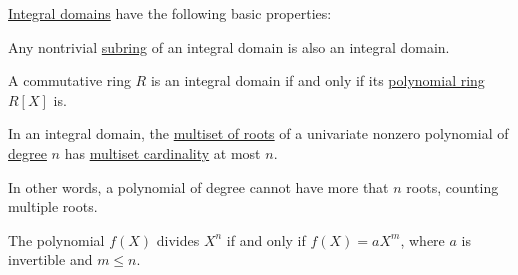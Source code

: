 \begin{proposition}\label{thm:def:integral_domain}
  \hyperref[def:integral_domain]{Integral domains} have the following basic properties:
  \begin{thmenum}
     Any nontrivial \hyperref[def:ring/submodel]{subring} of an integral domain is also an integral domain.

     A commutative ring \( R \) is an integral domain if and only if its \hyperref[def:polynomial_algebra]{polynomial ring} \( R[X] \) is.

     In an integral domain, the \hyperref[def:multiple_root]{multiset of roots} of a univariate nonzero polynomial of \hyperref[def:polynomial_degree]{degree} \( n \) has \hyperref[def:multiset]{multiset cardinality} at most \( n \).

    In other words, a polynomial of degree cannot have more that \( n \) roots, counting multiple roots.

     The polynomial \( f(X) \) divides \( X^n \) if and only if \( f(X) = aX^m \), where \( a \) is invertible and \( m \leq n \).
  \end{thmenum}
\end{proposition}
